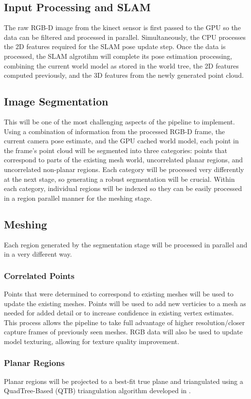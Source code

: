 \documentclass[english]{article}
\begin{document}
\subsection{Input Processing and SLAM}
The raw RGB-D image from the kinect sensor is first passed to the GPU so the data can be filtered and processed in parallel. Simultaneously, the CPU processes the 2D features required for the SLAM pose update step. Once the data is processed, the SLAM algrotihm will complete its pose estimation processing, combining the current world model as stored in the world tree, the 2D features computed previously, and the 3D features from the newly generated point cloud.

\subsection{Image Segmentation}

This will be one of the most challenging aspects of the pipeline to implement. Using a combination of information from the processed RGB-D frame, the current camera pose estimate, and the GPU cached world model, each point in the frame's point cloud will be segmented into three categories: points that correspond to parts of the existing mesh world, uncorrelated planar regions, and uncorrelated non-planar regions. Each category will be processed very differently at the next stage, so generating a robust segmentation will be crucial. Within each category, individual regions will be indexed so they can be easily processed in a region parallel manner for the meshing stage.

\subsection{Meshing}
Each region generated by the segmentation stage will be processed in parallel and in a very different way.
\subsubsection{Correlated Points}
Points that were determined to correspond to existing meshes will be used to update the existing meshes. Points will be used to add new verticies to a mesh as needed for added detail or to increase confidence in existing vertex estimates. This process allows the pipeline to take full advantage of higher resolution/closer capture frames of previously seen meshes. RGB data will also be used to update model texturing, allowing for texture quality improvement.

\subsubsection{Planar Regions}
Planar regions will be projected to a best-fit true plane and triangulated using a QuadTree-Based (QTB) triangulation algorithm developed in \cite{planesegmentationQTB}.






\end{document}
